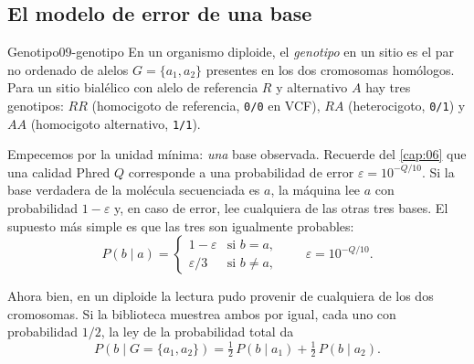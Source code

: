 \subsection{El modelo de error de una base}

\begin{definicion}{Genotipo}{09-genotipo}
En un organismo diploide, el \emph{genotipo} en un sitio es el par no ordenado de alelos $G=\{a_1,a_2\}$ presentes en los dos cromosomas homólogos. Para un sitio bialélico con alelo de referencia $R$ y alternativo $A$ hay tres genotipos: $RR$ (homocigoto de referencia, \texttt{0/0} en VCF), $RA$ (heterocigoto, \texttt{0/1}) y $AA$ (homocigoto alternativo, \texttt{1/1}).
\end{definicion}

Empecemos por la unidad mínima: \emph{una} base observada. Recuerde del \cref{cap:06} que una calidad Phred $Q$ corresponde a una probabilidad de error $\varepsilon=10^{-Q/10}$. Si la base verdadera de la molécula secuenciada es $a$, la máquina lee $a$ con probabilidad $1-\varepsilon$ y, en caso de error, lee cualquiera de las otras tres bases. El supuesto más simple es que las tres son igualmente probables:
\begin{equation}\label{eq:09-pbase}
P(b \mid a) =
\begin{cases}
1-\varepsilon & \text{si } b = a,\\[2pt]
\varepsilon/3 & \text{si } b \neq a,
\end{cases}
\qquad \varepsilon = 10^{-Q/10}.
\end{equation}

\begin{simbolos}
\end{simbolos}

Ahora bien, en un diploide la lectura pudo provenir de cualquiera de los dos cromosomas. Si la biblioteca muestrea ambos por igual, cada uno con probabilidad $1/2$, la ley de la probabilidad total da
\begin{equation}\label{eq:09-pbaseG}
P(b \mid G=\{a_1,a_2\}) = \tfrac12\,P(b\mid a_1) + \tfrac12\,P(b\mid a_2).
\end{equation}

\begin{simbolos}
\end{simbolos}

